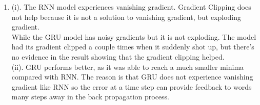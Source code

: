 \documentclass[10pt]{article}
\begin{document}
\begin{enumerate}[label=(\alph*)]
\item
(i). The RNN model experiences vanishing gradient. Gradient Clipping does not help because it is not a solution to vanishing gradient, but exploding gradient.\\ 
While the GRU model has noisy gradients but it is not exploding. The model had its gradient clipped a couple times when it suddenly shot up, but there's no evidence in the result showing that the gradient clipping helped.\\
(ii). GRU performs better, as it was able to reach a much smaller minima compared with RNN. The reason is that GRU does not experience vanishing gradient like RNN so the error at a time step can provide feedback to words many steps away in the back propagation process. 
 
\begin{figure}[ht]
\centering
    \qquad

\end{figure}
\end{enumerate}
\end{document}

